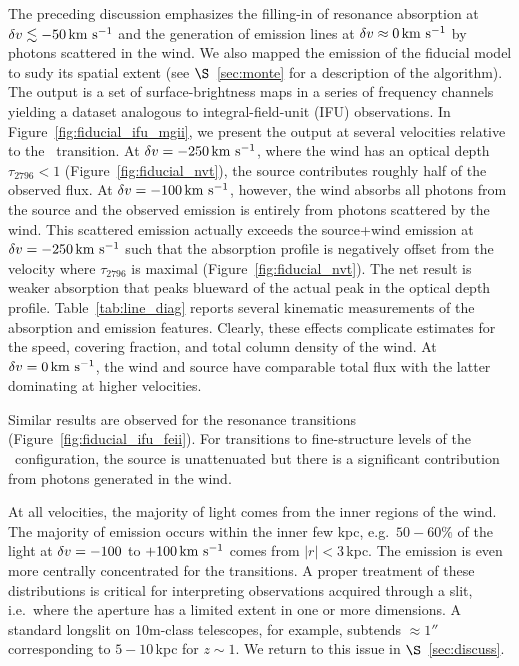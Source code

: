 \documentclass[12pt,preprint]{aastex}
\begin{document}
The preceding discussion emphasizes the filling-in of resonance
absorption at $\delta v
\lesssim -50 \, {\rm km~s^{-1}}$ and the generation of emission lines at $\delta v \approx
0 \, {\rm km~s^{-1}}$ by photons scattered in the wind.  We also
mapped the emission of the fiducial
model to sudy its spatial extent (see $\S$~\ref{sec:monte} for a description of the algorithm).
The output is a set of surface-brightness maps in a series of 
frequency channels yielding a
dataset analogous to integral-field-unit (IFU) observations.  In
Figure~\ref{fig:fiducial_ifu_mgii}, we present the output 
at several velocities relative to the \mgiia\
transition. At $\delta v = -250 \, {\rm km~s^{-1}}$, where the wind has an optical
depth $\tau_{2796} < 1$ (Figure~\ref{fig:fiducial_nvt}),
the source contributes roughly half of the observed flux.  
At $\delta v=-100 \, {\rm km~s^{-1}}$, however, the
wind absorbs all photons from the source and the observed emission is
entirely from photons scattered by the wind.  This scattered emission
actually exceeds the source+wind emission at 
$\delta v = -250 \, {\rm km~s^{-1}}$ such that the absorption profile is
negatively offset from the velocity where $\tau_{2796}$ is maximal
(Figure~\ref{fig:fiducial_nvt}).
The net result is
weaker  absorption that peaks blueward of the actual peak in the
optical depth profile.  
Table~\ref{tab:line_diag} reports several kinematic measurements of
the absorption and emission features.
Clearly, these effects complicate estimates for the
speed, covering fraction, and total column density of the wind.  At
$\delta v = 0 \, {\rm km~s^{-1}}$, the wind and source have comparable total flux with the
latter dominating at higher velocities.  

Similar results are observed for the  resonance
transitions (Figure~\ref{fig:fiducial_ifu_feii}).
For transitions to fine-structure levels of the \aconfig\
configuration, the source
is unattenuated but there is a significant contribution from photons
generated in the wind. 

At all velocities, the majority of light comes from the inner regions
of the wind. 
The majority of
 emission occurs within the inner few kpc, e.g.\ $50-60\%$
of the light at $\delta v=-100$ to $+100 \, {\rm km~s^{-1}}$
comes from $|r| < 3$\,kpc.
The emission
is even more centrally concentrated for the  transitions.
A proper treatment of these
distributions is critical for interpreting observations
acquired through a slit, i.e.\ where the aperture has a limited extent
in one or more dimensions.  A standard longslit on 10m-class
telescopes, for example, subtends $\approx 1''$ corresponding to
$5-10$\,kpc for $z \sim 1$.    We return to this issue in
$\S$~\ref{sec:discuss}. 
\end{document}
